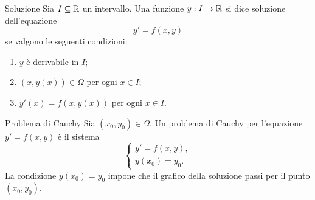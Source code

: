 \documentclass[a4paper]{article}
\begin{document}
\begin{radioactive}
\begin{snippetdefinition}{Soluzione}
    Sia \(I\subseteq\mathbb{R}\) un intervallo. Una funzione \(y:I\to\mathbb{R}\) si dice soluzione dell'equazione
    \[
        y'=f(x,y)
    \]
    se valgono le seguenti condizioni:
    \begin{enumerate}
        \item \(y\) è derivabile in \(I\);
        \item \((x,y(x))\in\Omega\) per ogni \(x\in I\);
        \item \(y'(x)=f(x,y(x))\) per ogni \(x\in I\).
    \end{enumerate}
\end{snippetdefinition}
\end{radioactive}

\begin{radioactive}
\begin{snippetdefinition}{Problema di Cauchy}
    Sia \((x_0,y_0)\in\Omega\). Un problema di Cauchy per l'equazione \(y'=f(x,y)\) è il sistema
    \[
        \begin{cases}
            y'=f(x,y),\\
            y(x_0)=y_0.
        \end{cases}
    \]
    La condizione \(y(x_0)=y_0\) impone che il grafico della soluzione passi per il punto \((x_0,y_0)\).
\end{snippetdefinition}
\end{radioactive}
\end{document}
